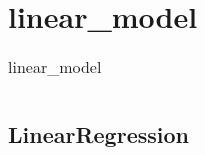 \chapter{linear_model\label{linearmodel}}
\begin{table}
    \centering
    \caption{linear\_model}
    \begin{tabular}{l}
        \hline
        \nameref{LinearRegression} \\
        \hline
    \end{tabular}
\end{table}
\section{LinearRegression\label{LinearRegression}}